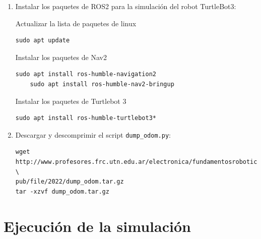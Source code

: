 \documentclass[tp]{lcc}
\begin{document}
\begin{enumerate}

\item Instalar los paquetes de ROS2 para la simulación del robot TurtleBot3:

Actualizar la lista de paquetes de linux
\begin{lstlisting}[style=bash] 
    sudo apt update
\end{lstlisting}

Instalar los paquetes de Nav2 
\begin{lstlisting}[style=bash] 
	sudo apt install ros-humble-navigation2
	sudo apt install ros-humble-nav2-bringup
\end{lstlisting}

Instalar los paquetes de Turtlebot 3
\begin{lstlisting}[style=bash] 
	sudo apt install ros-humble-turtlebot3*
\end{lstlisting}

	\item Descargar y descomprimir el script \lstinline[style=bash]{dump_odom.py}:
	
\begin{lstlisting}[style=bash] 
wget http://www.profesores.frc.utn.edu.ar/electronica/fundamentosroboticamovil/ \
pub/file/2022/dump_odom.tar.gz
tar -xzvf dump_odom.tar.gz
\end{lstlisting}
	
\end{enumerate}

\section{Ejecución de la simulación}
\end{document}
